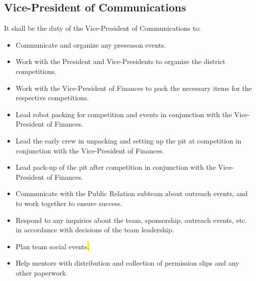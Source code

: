\documentclass[12pt, a4paper]{article}
\begin{document}
\subsection{Vice-President of Communications}
It shall be the duty of the Vice-President of Communications to:
\begin{itemize}
\item Communicate and organize any preseason events.
\item Work with the President and Vice-Presidents to organize the district competitions.
\item Work with the Vice-President of Finances to pack the necessary items for the respective competitions.
\item Lead robot packing for competition and events in conjunction with the Vice-President of Finances.
\item Lead the early crew in unpacking and setting up the pit at competition in conjunction with the Vice-President of Finances.
\item Lead pack-up of the pit after competition in conjunction with the Vice-President of Finances.
\item Communicate with the Public Relation subteam about outreach events, and to work together to ensure success.
\item Respond to any inquiries about the team, sponsorship, outreach events, etc. in accordance with decisions of the team leadership.
\item Plan team social events\hl{.}
\item Help mentors with distribution and collection of permission slips and any other paperwork.
\end{itemize}
\end{document}
